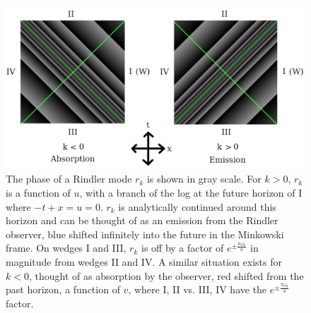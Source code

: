 \documentclass[12pt,a4paper]{article}
\begin{document}
\begin{figure}[h]
  \centering
  \captionsetup{width=0.8\linewidth}
\includegraphics[scale=0.3]{analytic.png}
\caption{The phase of a Rindler mode $r_k$ is shown in gray scale. For $k>0$, $r_k$ is a function of $u$, with a branch of the log at the future horizon of I where $-t + x = u = 0$. $r_k$ is analytically continued around this horizon and can be thought of as an emission from the Rindler observer, blue shifted infinitely into the future in the Minkowski frame. On wedges I and III, $r_k$ is off by a factor of $e^{\pm \frac{\pi \omega_k}{a}}$ in magnitude from wedges II and IV.  A similar situation exists for $k<0$, thought of as absorption by the observer, red shifted from the past horizon, a function of $v$, where I, II vs. III, IV have the $e^{\pm \frac{\pi \omega_k}{a}}$ factor.}
\label{analytic}
\end{figure}
\end{document}
